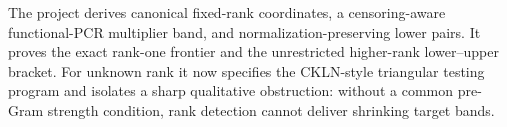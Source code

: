 The project derives canonical fixed-rank coordinates, a censoring-aware functional-PCR multiplier band, and normalization-preserving lower pairs.  It proves the exact rank-one frontier and the unrestricted higher-rank lower--upper bracket.  For unknown rank it now specifies the CKLN-style triangular testing program and isolates a sharp qualitative obstruction: without a common pre-Gram strength condition, rank detection cannot deliver shrinking target bands.